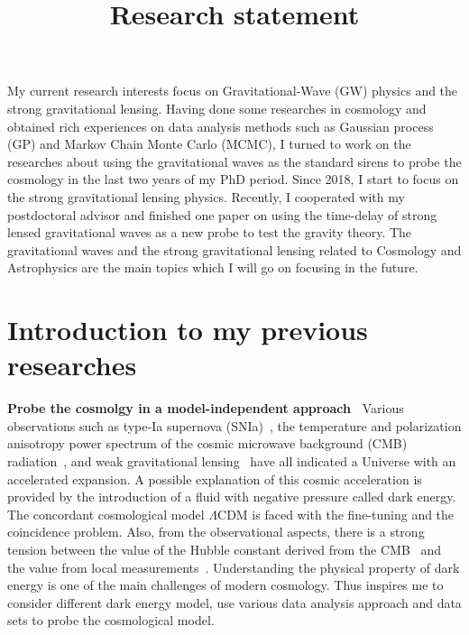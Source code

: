 \documentclass[11pt,letterpaper,sans]{moderncv}   %
\title{Research statement}
\begin{document}
\pagestyle{headonly}


\maketitle









My current research interests focus on Gravitational-Wave (GW) physics and the strong gravitational lensing. Having done some researches in cosmology and  obtained rich experiences on data analysis methods such as Gaussian process (GP) and Markov Chain Monte Carlo (MCMC), I turned to work on the researches about using the gravitational waves as the standard sirens to probe the cosmology in the last two years of my PhD period. Since 2018, I start to focus on the strong gravitational lensing physics. Recently, I cooperated with my postdoctoral advisor and finished one paper on using the time-delay of strong lensed gravitational waves as a new probe to test the gravity theory. The gravitational waves and the strong gravitational lensing related to Cosmology and  Astrophysics are the main topics which I will go on focusing in the future. 
\vspace{5mm}



\section{\textcolor{color1}{\textbf{Introduction to my previous researches}}}

\vspace{2mm}
\textcolor{color1}{\textbf{Probe the cosmolgy in a model-independent approach~\cite{Cai:2015zoa,Cai:2015pia,Cai:2016vmn}}}
Various observations such as type-Ia supernova (SNIa)~\cite{Riess:1998cb,Perlmutter:1998np,Suzuki:2011hu,Betoule:2014frx}, the temperature and polarization anisotropy power spectrum of the cosmic microwave background (CMB) radiation~\cite{Hinshaw:2012aka,Ade:2015xua}, and weak gravitational lensing~\cite{Kilbinger:2008gk} have all indicated a Universe with an accelerated expansion. A possible explanation of this cosmic acceleration is provided by the introduction of a fluid with negative pressure called dark energy. The concordant cosmological model $\Lambda$CDM is faced with the fine-tuning and the coincidence problem. 
Also, from the observational aspects, there is a strong tension between the value of the Hubble constant derived from the CMB~\cite{Ade:2015xua} and the value from local measurements~\cite{Riess:2011yx}. Understanding the physical property of dark energy is one of the main challenges of modern cosmology. Thus inspires me to consider different dark energy model, use various data analysis approach and data sets to probe the cosmological model.
\end{document}
